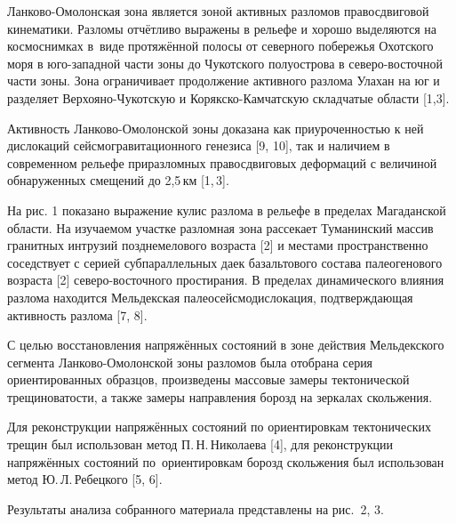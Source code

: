



\makeProcTitleII



Ланково-Омолонская зона является зоной активных разломов правосдвиговой
кинематики. Разломы отчётливо выражены в рельефе и хорошо выделяются на космоснимках
в~виде протяжённой полосы от северного побережья Охотского моря в юго-западной
части зоны до Чукотского полуострова в северо-восточной части зоны.
Зона ограничивает продолжение активного разлома Улахан на юг и разделяет
Верхояно-Чукотскую и Корякско-Камчатскую складчатые области [1,3].


Активность Ланково-Омолонской зоны доказана как приуроченностью к ней
дислокаций сейсмогравитационного генезиса [9, 10], так и наличием в современном рельефе приразломных правосдвиговых деформаций
с величиной обнаруженных смещений до 2,5\,км [1,\,3].

На рис. 1 показано выражение кулис разлома в рельефе в пределах Магаданской области.
На изучаемом участке разломная зона рассекает Туманинский массив
гранитных интрузий позднемелового возраста [2]
и местами пространственно соседствует с серией субпараллельных даек
базальтового состава палеогенового возраста [2] северо-восточного простирания.
В пределах динамического влияния разлома находится Мельдекская
палеосейсмодислокация, подтверждающая активность разлома [7, 8].


\clearpage
С целью восстановления напряжённых состояний в зоне действия Мельдекского
сегмента Ланково-Омолонской зоны разломов была отобрана серия ориентированных
образцов, произведены массовые замеры тектонической трещиноватости, а также
замеры направления борозд  на зеркалах скольжения.

Для реконструкции напряжённых состояний по ориентировкам тектонических трещин был использован метод П.\,Н.\,Николаева [4], для реконструкции напряжённых состояний по~ориентировкам борозд скольжения был использован метод Ю.\,Л.\,Ребецкого [5, 6].

Результаты анализа собранного материала представлены на рис.~2, 3.

